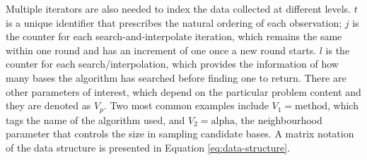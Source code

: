 Multiple iterators are also needed to index the data collected at different levels. \(t\) is a unique identifier that prescribes the natural ordering of each observation; \(j\) is the counter for each search-and-interpolate iteration, which remains the same within one round and has an increment of one once a new round starts. \(l\) is the counter for each search/interpolation, which provides the information of how many bases the algorithm has searched before finding one to return. There are other parameters of interest, which depend on the particular problem content and they are denoted as \emph{\(V_{p}\)}. Two most common examples include \(V_1 = \text{method}\), which tags the name of the algorithm used, and \(V_2 = \text{alpha}\), the neighbourhood parameter that controls the size in sampling candidate bases. A matrix notation of the data structure is presented in Equation \ref{eq:data-structure}.

